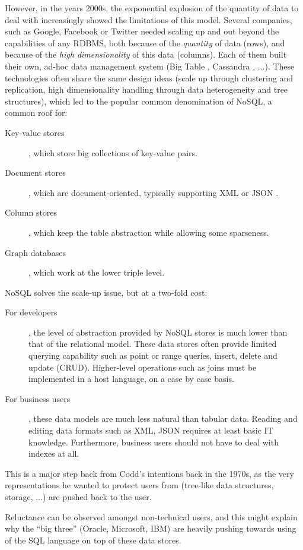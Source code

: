 \documentclass{acm_proc_article-sp}
\begin{document}
However, in the years 2000s, the exponential explosion of the quantity of data to deal with increasingly showed the limitations of this model. Several companies, such as Google, Facebook or Twitter needed scaling up and out beyond the capabilities of any RDBMS, both because of the \emph{quantity} of data (rows), and because of the \emph{high dimensionality} of this data (columns). Each of them built their own, ad-hoc data management system (Big Table \cite{Chang2008}, Cassandra \cite{Lakshman2010}, ...). These technologies often share the same design ideas (scale up through clustering and replication, high dimensionality handling through data heterogeneity and tree structures), which led to the popular common denomination of NoSQL, a common roof for:
\begin{description}
\item[Key-value stores], which store big collections of key-value pairs.
\item[Document stores], which are document-oriented, typically supporting XML \cite{XML} or JSON \cite{JSON}.
\item[Column stores], which keep the table abstraction while allowing some sparseness.
\item[Graph databases], which work at the lower triple level.
\end{description}

NoSQL solves the scale-up issue, but at a two-fold cost:
\begin{description}
\item[For developers], the level of abstraction provided by NoSQL stores is much lower than that of the relational model. These data stores often provide limited querying capability such as point or range queries, insert, delete and update (CRUD). Higher-level operations such as joins must be implemented in a host language, on a case by case basis.
\item[For business users], these data models are much less natural than tabular data. Reading and editing data formats such as XML, JSON requires at least basic IT knowledge. Furthermore, business users should not have to deal with indexes at all.
\end{description}

This is a major step back from Codd's intentions back in the 1970s, as the very representations he wanted to protect users from (tree-like data structures, storage, ...) are pushed back to the user.

Reluctance can be observed amongst non-technical users, and this might explain why the ``big three'' (Oracle, Microsoft, IBM) are heavily pushing towards using of the SQL language \cite{Chamberlin1974} on top of these data stores.
\end{document}
